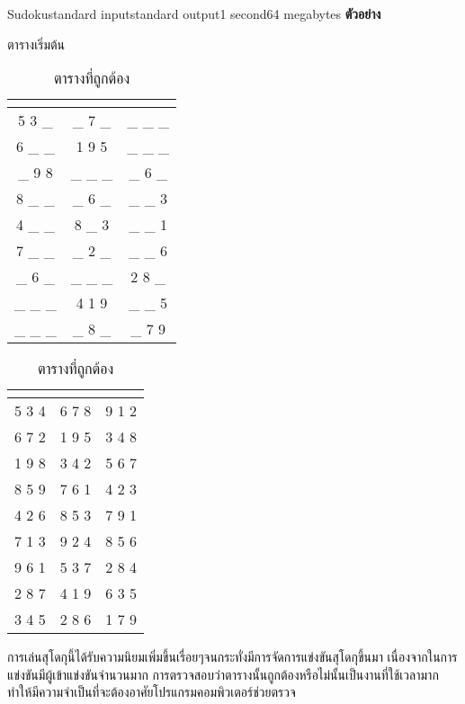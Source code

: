 \documentclass[11pt,a4paper]{article}
\begin{document}
\begin{problem}{Sudoku}{standard input}{standard output}{1 second}{64 megabytes}
\textbf{ตัวอย่าง}
\begin{table}[!htb]
\begin{minipage}{.5\linewidth}
\caption{ตารางเริ่มต้น}
      \centering
\begin{tabular}{ |c|c|c| } 
\multicolumn{3}{c}{}\\
\hline
\rule{0pt}{3ex}  
5  3 \_ & \_  7 \_ & \_  \_  \_\\[0.5ex]
 6  \_  \_ & 1 9 5 & \_  \_  \_ \\[0.5ex]
 \_  9 8 & \_  \_  \_ & \_  6  \_\\[0.75ex]
\hline
\rule{0pt}{3ex}
 8  \_  \_ & \_  6  \_ & \_  \_  3\\[0.5ex]
 4  \_  \_ & 8  \_  3 & \_  \_  1\\[0.5ex]
 7  \_  \_ & \_  2  \_ & \_  \_  6\\[0.75ex]
\hline
\rule{0pt}{3ex} 
 \_  6  \_ & \_  \_  \_ & 2  8  \_\\[0.5ex]  
 \_  \_  \_ & 4  1  9 & \_  \_  5\\[0.5ex]
 \_  \_  \_ & \_  8  \_ & \_  7 9\\[0.75ex]
 \hline
\end{tabular}
\end{minipage}%
\begin{minipage}{.3\linewidth}
\caption{ตารางที่ถูกต้อง}
      \centering
\begin{tabular}{ |c|c|c| } 
\multicolumn{3}{c}{}\\
\hline
\rule{0pt}{3ex}  
 5 3 4 & 6 7 8 & 9 1 2\\[0.5ex]
  6 7 2 & 1 9 5 & 3 4 8\\[0.5ex]
  1 9 8 & 3 4 2 & 5 6 7\\[0.75ex]
\hline
\rule{0pt}{3ex}  
  8 5 9 & 7 6 1 & 4 2 3\\[0.5ex]
  4 2 6 & 8 5 3 & 7 9 1\\[0.5ex]
  7 1 3 & 9 2 4 & 8 5 6\\[0.75ex]
\hline
\rule{0pt}{3ex}  
  9 6 1 & 5 3 7 & 2 8 4\\[0.5ex]
  2 8 7 & 4 1 9 & 6 3 5\\[0.5ex]
  3 4 5 & 2 8 6 & 1 7 9\\[0.75ex]
  \hline
\end{tabular}
\end{minipage}
\end{table}

การเล่นสุโดกุนี้ได้รับความนิยมเพิ่มขึ้นเรื่อยๆจนกระทั่งมีการจัดการแข่งขันสุโดกุขึ้นมา เนื่องจากในการแข่งขันมีผู้เข้าแข่งขันจำนวนมาก การตรวจสอบว่าตารางนั้นถูกต้องหรือไม่นั้นเป็นงานที่ใช้เวลามาก ทำให้มีความจำเป็นที่จะต้องอาศัยโปรแกรมคอมพิวเตอร์ช่วยตรวจ




\end{problem}
\end{document}
